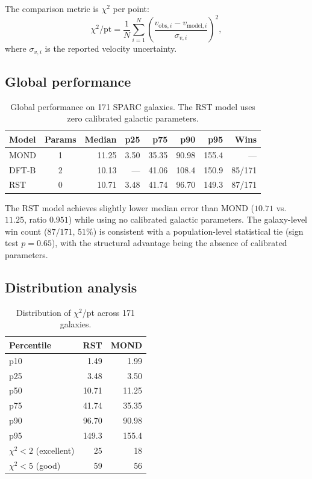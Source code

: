 \documentclass[11pt,a4paper]{article}
\begin{document}
The comparison metric is $\chi^2$ per point:
\begin{equation}
\chi^2/\mathrm{pt} = \frac{1}{N} \sum_{i=1}^{N} \left(\frac{v_{\mathrm{obs},i} - v_{\mathrm{model},i}}{\sigma_{v,i}}\right)^2,
\end{equation}
where $\sigma_{v,i}$ is the reported velocity uncertainty.

\subsection{Global performance}
\label{sec:global}

\begin{table}[h]
\centering
\caption{Global performance on 171 SPARC galaxies. The RST model uses zero calibrated galactic parameters.}
\label{tab:global}
\begin{tabular}{lcrrrrrr}
\toprule
\textbf{Model} & \textbf{Params} & \textbf{Median} & \textbf{p25} & \textbf{p75} & \textbf{p90} & \textbf{p95} & \textbf{Wins} \\
\midrule
MOND & 1 & 11.25 & 3.50 & 35.35 & 90.98 & 155.4 & --- \\
DFT-B & 2 & 10.13 & --- & 41.06 & 108.4 & 150.9 & 85/171 \\
RST & 0 & 10.71 & 3.48 & 41.74 & 96.70 & 149.3 & 87/171 \\
\bottomrule
\end{tabular}
\end{table}

The RST model achieves slightly lower median error than MOND ($10.71$ vs.\ $11.25$, ratio $0.951$) while using no calibrated galactic parameters.
The galaxy-level win count ($87/171$, $51\%$) is consistent with a population-level statistical tie (sign test $p = 0.65$), with the structural advantage being the absence of calibrated parameters.

\subsection{Distribution analysis}
\label{sec:distribution}

\begin{table}[h]
\centering
\caption{Distribution of $\chi^2$/pt across 171 galaxies.}
\label{tab:dist}
\begin{tabular}{lrr}
\toprule
\textbf{Percentile} & \textbf{RST} & \textbf{MOND} \\
\midrule
p10 & 1.49 & 1.99 \\
p25 & 3.48 & 3.50 \\
p50 & 10.71 & 11.25 \\
p75 & 41.74 & 35.35 \\
p90 & 96.70 & 90.98 \\
p95 & 149.3 & 155.4 \\
\midrule
$\chi^2 < 2$ (excellent) & 25 & 18 \\
$\chi^2 < 5$ (good) & 59 & 56 \\
\bottomrule
\end{tabular}
\end{table}
\end{document}
